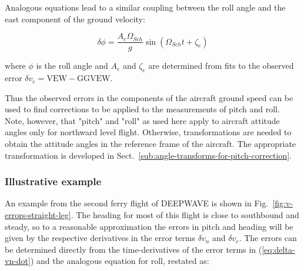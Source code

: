 \documentclass[12pt,twoside,english]{article}\usepackage[]{graphicx}\usepackage[]{color}
\let\OrgIndex\index
\renewcommand*{\index}[1]{\OrgIndex{#1}}
\begin{document}
Analogous equations lead to a similar coupling between the roll angle and the east component of the ground velocity: 

\begin{equation}
\delta\phi=\frac{A_{e}\Omega_{Sch}}{g}\sin(\Omega_{Sch}t+\zeta_{e})\label{eq:solution-delta-phi} 
\end{equation}


where $\phi$ is the roll angle and $A_{e}$ and $\zeta_{e}$ are determined from fits to the observed error $\delta v_{e}=\mathrm{VEW-GGVEW}$. 

Thus the observed errors in the components of the aircraft ground  speed can be used to find corrections to be applied to the measurements of pitch and roll. Note, however, that "pitch" and "roll" as used here apply to aircraft attitude angles only for northward level flight. Otherwise, transformations are needed to obtain the attitude angles in the reference frame of the aircraft. The appropriate transformation is developed in Sect.~\ref{sub:angle-transforms-for-pitch-correction}.


\subsubsection{Illustrative example}

An example from the second ferry flight of DEEPWAVE is shown in Fig.~\ref{fig:v-errors-straight-leg}. The heading for most of this flight is close to southbound and steady, so to a reasonable approximation the errors in pitch and heading will be given by the respective derivatives in the error terms $\delta v_{n}$ and $\delta v_{e}$. 
The errors can be determined directly from the time-derivatives of the error terms in (\ref{eq:delta-vn-dot}) and the analogous equation for roll, restated as: 
\end{document}
